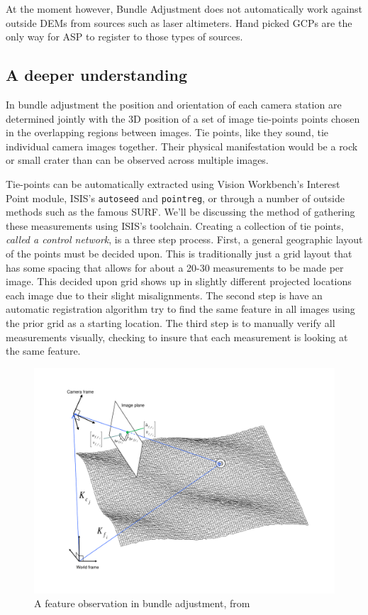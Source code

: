 At the moment however, Bundle Adjustment does not automatically work
against outside DEMs from sources such as laser altimeters. Hand
picked \acp{GCP} are the only way for \ac{ASP} to register to those
types of sources.

\subsection{A deeper understanding}

In bundle adjustment the position and orientation of each camera
station are determined jointly with the 3D position of a set of image
tie-points points chosen in the overlapping regions between
images. Tie points, like they sound, tie individual camera images
together. Their physical manifestation would be a rock or small crater
than can be observed across multiple images.

Tie-points can be automatically extracted using Vision Workbench's
Interest Point module, \ac{ISIS}'s \texttt{autoseed} and \texttt{pointreg},
or through a number of outside methods such as the famous
SURF\citep{surf08}. We'll be discussing the method of gathering these
measurements using \ac{ISIS}'s toolchain. Creating a collection of tie
points, {\it called a control network}, is a three step process. First, a
general geographic layout of the points must be decided upon. This is
traditionally just a grid layout that has some spacing that allows for
about a 20-30 measurements to be made per image. This decided upon grid
shows up in slightly different projected locations each image due to
their slight misalignments. The second step is have an automatic
registration algorithm try to find the same feature in all images using
the prior grid as a starting location. The third step is to manually
verify all measurements visually, checking to insure that each
measurement is looking at the same feature.

\begin{figure}[b!]
  \begin{center}
  \includegraphics[trim=20mm 20mm 20mm 15mm,clip,width=6in]{images/ba_feature_observation.pdf}
  \end{center}
  \caption{ A feature observation in bundle adjustment, from \citet{moore09} }
  \label{fig:ba_feature}
\end{figure}

